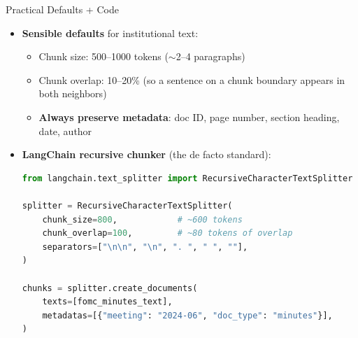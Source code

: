 \begin{frame}[fragile]{Practical Defaults + Code}
\begin{itemize}
\item \textbf{Sensible defaults} for institutional text:
\begin{itemize}
    \item Chunk size: 500--1000 tokens ($\sim$2--4 paragraphs)
    \item Chunk overlap: 10--20\% (so a sentence on a chunk boundary appears in both neighbors)
    \item \textbf{Always preserve metadata}: doc ID, page number, section heading, date, author
\end{itemize}

\medskip
\item \textbf{LangChain recursive chunker} (the de facto standard):
\begin{lstlisting}[language=Python]
from langchain.text_splitter import RecursiveCharacterTextSplitter

splitter = RecursiveCharacterTextSplitter(
    chunk_size=800,            # ~600 tokens
    chunk_overlap=100,         # ~80 tokens of overlap
    separators=["\n\n", "\n", ". ", " ", ""],
)

chunks = splitter.create_documents(
    texts=[fomc_minutes_text],
    metadatas=[{"meeting": "2024-06", "doc_type": "minutes"}],
)
\end{lstlisting}
\end{itemize}
\end{frame}

